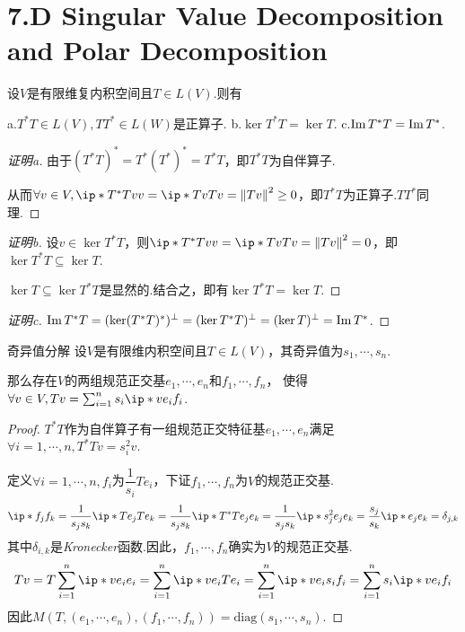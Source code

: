 \section{7.D Singular Value Decomposition and Polar Decomposition}

\begin{lemma}[7.64*]\label{lem 7.64*}
    设\(V\)是有限维复内积空间且\(T \in L(V)\).则有

    a.\(T^*T \in L(V),TT^* \in L(W)\)是正算子. \quad b.\(\ker T^*T=\ker T\). \quad c.\(\operatorname{Im} T^*T=\operatorname{Im} T^*\).
\end{lemma}

\begin{proof}[证明a]
    由于\((T^*T)^*=T^*(T^*)^*=T^*T\)，即\(T^*T\)为自伴算子.

    从而\(\forall v \in V,\ip*{T^*Tv}{v}=\ip*{Tv}{Tv}=\norm*{Tv}^2 \geq 0\)，即\(T^*T\)为正算子.\(TT^*\)同理.
\end{proof}

\begin{proof}[证明b]
    设\(v \in \ker T^*T\)，则\(\ip*{T^*Tv}{v}=\ip*{Tv}{Tv}=\norm*{Tv}^2=0\)，即\(\ker T^*T \subseteq \ker T\).

    \(\ker T \subseteq \ker T^*T\)是显然的.结合之，即有\(\ker T^*T=\ker T\).    
\end{proof}

\begin{proof}[证明c]
    \(\operatorname{Im} T^*T=(\ker (T^*T)^*)^\bot=(\ker T^*T)^\bot=(\ker T)^\bot=\operatorname{Im} T^*\).
\end{proof}

\begin{theorem}[7.70*]\label{thm 7.70*} 奇异值分解 \:
    设\(V\)是有限维内积空间且\(T \in L(V)\)，其奇异值为\(s_1,\cdots,s_n\).

    那么存在\(V\)的两组规范正交基\(e_1,\cdots,e_n\)和\(f_1,\cdots,f_n\)，
    使得\(\forall v \in V,Tv=\sum_{i=1}^n s_i\ip*{v}{e_i}f_i\).
\end{theorem}

\begin{proof}
    \(T^*T\)作为自伴算子有一组规范正交特征基\(e_1,\cdots,e_n\)满足\(\forall i=1,\cdots,n,T^*Tv=s_i^2 v\).

    定义\(\forall i=1,\cdots,n,f_i\)为\(\dfrac{1}{s_i}Te_i\)，下证\(f_1,\cdots,f_n\)为\(V\)的规范正交基.
    \begin{align*}
        \ip*{f_j}{f_k}=\dfrac{1}{s_js_k}\ip*{Te_j}{Te_k}=\dfrac{1}{s_js_k}\ip*{T^*Te_j}{e_k}
        =\dfrac{1}{s_js_k}\ip*{s_j^2 e_j}{e_k}=\dfrac{s_j}{s_k}\ip*{e_j}{e_k}=\delta_{j,k}
    \end{align*}
    其中\(\delta_{i,k}\)是\textit{Kronecker}函数.因此，\(f_1,\cdots,f_n\)确实为\(V\)的规范正交基.
    \begin{align*}
        Tv=T\sum_{i=1}^n \ip*{v}{e_i}e_i=\sum_{i=1}^n \ip*{v}{e_i}Te_i
        =\sum_{i=1}^n \ip*{v}{e_i}s_if_i=\sum_{i=1}^n s_i\ip*{v}{e_i}f_i
    \end{align*}
    因此\(M(T,(e_1,\cdots,e_n),(f_1,\cdots,f_n))=\mathrm{diag}(s_1,\cdots,s_n)\).
\end{proof}

